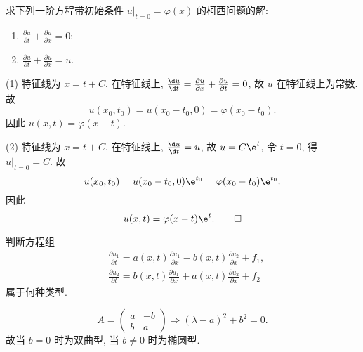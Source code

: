 \begin{exercise}
  求下列一阶方程带初始条件 $u|_{t=0} = \varphi(x)$ 的柯西问题的解:
  \begin{enumerate}[(1)]
    \item $\frac{\partial u}{\partial t} + \frac{\partial u}{\partial x} = 0$;
    \item $\frac{\partial u}{\partial t} + \frac{\partial u}{\partial x} = u$.
  \end{enumerate}
\end{exercise}

\begin{solve}
  (1) 特征线为 $x = t+C$, 在特征线上, $\frac{\d u}{\d t} = 
    \frac{\partial u}{\partial x} + \frac{\partial u}{\partial t} = 0$,
  故 $u$ 在特征线上为常数. 故
  \[u(x_0, t_0) = u(x_0-t_0, 0) = \varphi(x_0-t_0).\]
  因此 $u(x,t) = \varphi(x-t)$.

  (2) 特征线为 $x = t+C$, 在特征线上, $\frac{\d u}{\d t} = u$,
  故 $u = C\e^t$, 令 $t=0$, 得 $u|_{t=0} = C$. 故
  \[u(x_0, t_0) = u(x_0-t_0, 0) \e^{t_0} = \varphi(x_0-t_0)\e^{t_0}.\]
  因此
  \[u(x, t) = \varphi(x-t) \e^t. \qedhere\]
\end{solve}


\begin{exercise}
  判断方程组
  \begin{align*}
    & \frac{\partial u_1}{\partial t} = a(x,t) \frac{\partial u_1}{\partial x}
      - b(x,t) \frac{\partial u_2}{\partial x} + f_1, \\
    & \frac{\partial u_2}{\partial t} = b(x,t) \frac{\partial u_1}{\partial x}
      + a(x,t) \frac{\partial u_2}{\partial x} + f_2
  \end{align*}
  属于何种类型.
\end{exercise}

\begin{solve}
  \[A = \begin{pmatrix}
    a & -b \\
    b & a
  \end{pmatrix} \Rightarrow (\lambda-a)^2+b^2 = 0.\]
  故当 $b=0$ 时为双曲型, 当 $b\neq 0$ 时为椭圆型.
\end{solve}


